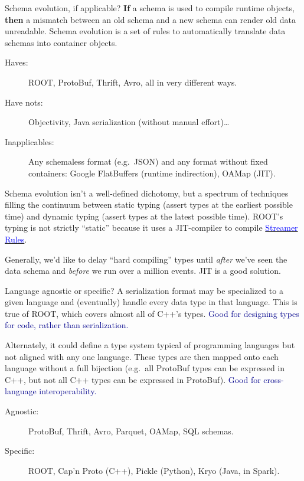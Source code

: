\documentclass[aspectratio=169]{beamer}
\begin{document}
\begin{frame}{Schema evolution, if applicable?}
\vspace{0.5 cm}
{\bf If} a schema is used to compile runtime objects, {\bf then} a mismatch between an old schema and a new schema can render old data unreadable. Schema evolution is a set of rules to automatically translate data schemas into container objects.

\begin{description}
\item[Haves:] ROOT, ProtoBuf, Thrift, Avro, all in very different ways.
\item[Have nots:] Objectivity, Java serialization (without manual effort)\ldots
\item[Inapplicables:] Any schemaless format (e.g.\ JSON) and any format without fixed containers: Google FlatBuffers (runtime indirection), OAMap (JIT).
\end{description}

\vspace{0.25 cm}

Schema evolution isn't a well-defined dichotomy, but a spectrum of techniques filling the continuum between static typing (assert types at the earliest possible time) and dynamic typing (assert types at the latest possible time). ROOT's typing is not strictly ``static'' because it uses a JIT-compiler to compile \href{https://root.cern.ch/root/SchemaEvolution.pdf}{\textcolor{blue}{Streamer Rules}}.

\vspace{0.25 cm}

Generally, we'd like to delay ``hard compiling'' types until {\it after} we've seen the data schema and {\it before} we run over a million events. JIT is a good solution.

\end{frame}

\begin{frame}{Language agnostic or specific?}
\vspace{0.5 cm}
A serialization format may be specialized to a given language and (eventually) handle every data type in that language. This is true of ROOT, which covers almost all of C++'s types. \textcolor{darkblue}{Good for designing types for code, rather than serialization.}

\vfill

Alternately, it could define a type system typical of programming languages but not aligned with any one language. These types are then mapped onto each language without a full bijection (e.g.\ all ProtoBuf types can be expressed in C++, but not all C++ types can be expressed in ProtoBuf). \textcolor{darkblue}{Good for cross-language interoperability.}

\vfill

\begin{description}
\item[Agnostic:] ProtoBuf, Thrift, Avro, Parquet, OAMap, SQL schemas.
\item[Specific:] ROOT, Cap'n Proto (C++), Pickle (Python), Kryo (Java, in Spark).
\end{description}
\end{frame}
\end{document}
